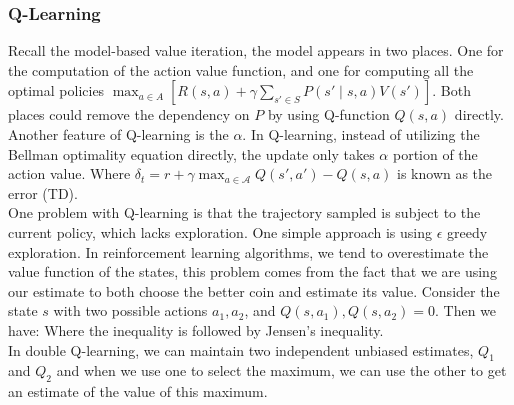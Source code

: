 \documentclass[12pt]{report}
\begin{document}
\subsubsection{Q-Learning}
Recall the model-based value iteration, the model appears in two places. One for the computation of the action value function,
and one for computing all the optimal policies $\max_{a\in A}\left[R(s,a)+\gamma\sum_{s'\in S}P(s'\mid s,a)V(s')\right]$. Both
places could remove the dependency on $P$ by using Q-function $Q(s,a)$ directly.\\
Another feature of Q-learning is the  $\alpha$. In Q-learning, instead of utilizing the Bellman optimality equation directly,
the update only takes $\alpha$ portion of the action value.
Where $\delta_t=r+\gamma\max_{a\in\mathcal{A}}Q(s',a')-Q(s,a)$ is known as the  error (TD).\\
One problem with Q-learning is that the trajectory sampled is subject to the current policy, which lacks exploration. One simple approach is
using $\epsilon$ greedy exploration.
In reinforcement learning algorithms, we tend to overestimate the value function of the states, this problem comes from the fact that we are using our estimate to both choose the
better coin and estimate its value. Consider the state $s$ with two possible actions $a_1, a_2$, and $Q(s,a_1),Q(s,a_2)=0$. Then we have:
Where the inequality is followed by Jensen's inequality.\\
In double Q-learning, we can maintain two independent unbiased estimates, $Q_1$ and $Q_2$ and when we use one to select the maximum, we can use the other to get an estimate of the value of this maximum.
\end{document}
